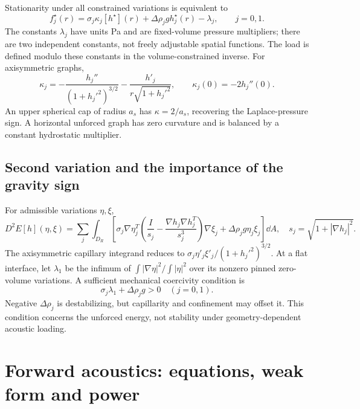 Stationarity under all constrained variations is equivalent to
\begin{equation}\label{eq:required-load}
 \boxed{f_j^\star(r)=\sigma_j\kappa_j[h^\star](r)
 +\Delta\rho_jg h_j^\star(r)-\lambda_j,\qquad j=0,1.}
\end{equation}
The constants $\lambda_j$ have units Pa and are fixed-volume pressure
multipliers; there are two independent constants, not freely adjustable
spatial functions. The load is defined modulo these constants in the
volume-constrained inverse. For axisymmetric graphs,
\begin{equation}\label{eq:axis-curvature}
 \kappa_j=-\frac{h_j''}{(1+h_j'^2)^{3/2}}
 -\frac{h'_j}{r\sqrt{1+h_j'^2}},\qquad \kappa_j(0)=-2h_j''(0).
\end{equation}
An upper spherical cap of radius $a_s$ has $\kappa=2/a_s$, recovering the
Laplace-pressure sign. A horizontal unforced graph has zero curvature and
is balanced by a constant hydrostatic multiplier.

\subsection{Second variation and the importance of the gravity sign}
For admissible variations $\eta,\xi$,
\begin{equation}\label{eq:hessian}
 D^2E[h](\eta,\xi)=\sum_j\int_{D_R}
 \left[\sigma_j\nabla\eta_j^T\left(
 \frac{I}{s_j}-\frac{\nabla h_j\nabla h_j^T}{s_j^3}\right)\nabla\xi_j
 +\Delta\rho_jg\eta_j\xi_j\right]\dd A,
 \quad s_j=\sqrt{1+|\nabla h_j|^2}.
\end{equation}
The axisymmetric capillary integrand reduces to
$\sigma_j\eta'_j\xi'_j/(1+h_j'^2)^{3/2}$. At a flat interface, let
$\lambda_1$ be the infimum of $\int|\nabla\eta|^2/\int|\eta|^2$ over its
nonzero pinned zero-volume variations. A sufficient mechanical coercivity
condition is
\begin{equation}\label{eq:coercivity}
 \sigma_j\lambda_1+\Delta\rho_jg>0\quad(j=0,1).
\end{equation}
Negative $\Delta\rho_j$ is destabilizing, but capillarity and confinement
may offset it. This condition concerns the unforced energy, not stability
under geometry-dependent acoustic loading.

\section{Forward acoustics: equations, weak form and power}
